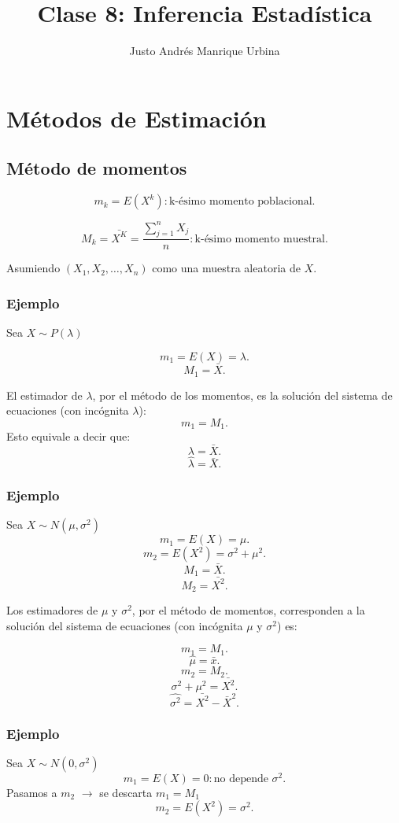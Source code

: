 \documentclass{article}
\title{Clase 8: Inferencia Estadística}
\author{Justo Andrés Manrique Urbina}
\begin{document}
\maketitle
\section{Métodos de Estimación}
\subsection{Método de momentos}

\[ m_{k}=E{(X^{k})}: \text{k-ésimo momento poblacional}.\]

\[ M_{k}=\bar{X^{K}}=\frac{\sum_{j=1}^{n}X_{j}}{n}: \text{k-ésimo momento muestral}.\]

Asumiendo $(X_{1},X_{2},\ldots,X_{n})$ como una muestra aleatoria de $X$.

\subsubsection{Ejemplo}
Sea $X \sim P{(\lambda)}$

\[ m_{1}=E{(X)}=\lambda.\]
\[ M_{1}=\bar{X}.\]

El estimador de $\lambda$, por el método de los momentos, es la solución del sistema de ecuaciones (con incógnita $\lambda$):
\[ m_{1}=M_{1}.\]
Esto equivale a decir que:
\[ \lambda=\bar{X}.\]
\[ \hat{\lambda}=\bar{X}.\]

\subsubsection{Ejemplo}
Sea $X\sim N{(\mu,\sigma^{2})}$
\[ m_{1}=E{(X)}=\mu.\]
\[ m_{2}=E{(X^{2})}=\sigma^{2}+\mu^{2}.\]
\[ M_{1}=\bar{X}.\]
\[ M_{2}=\bar{X^{2}}.\]

Los estimadores de $\mu$ y $\sigma^{2}$, por el método de momentos, corresponden a la solución del sistema de ecuaciones (con incógnita $\mu$ y $\sigma^{2}$) es:

\[ m_{1}=M_{1}.\]
\[ \hat{\mu}=\bar{x}.\]
\[ m_{2}=M_{2}.\]
\[ \sigma^{2}+\mu^{2}=\bar{X^{2}}.\]
\[ \hat{\sigma^{2}}=\bar{X^{2}}-\bar{X}^{2}.\]

\subsubsection{Ejemplo}
Sea $X\sim N{(0,\sigma^{2})}$
\[ m_{1}=E{(X)}=0: \text{no depende $\sigma^{2}$}.\]
Pasamos a $m_{2}$ $\rightarrow$ se descarta $m_{1}=M_{1}$
\[ m_{2}=E{(X^{2})}=\sigma^{2}.\]
\end{document}

